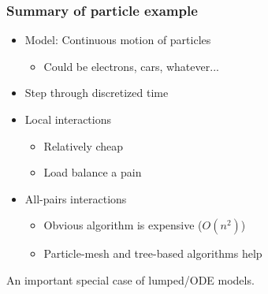 \documentclass{beamer}
\begin{document}
\begin{frame}
  \frametitle{Summary of particle example}

  \begin{itemize}
  \item Model: Continuous motion of particles
    \begin{itemize}
    \item Could be electrons, cars, whatever...
    \end{itemize}
  \item Step through discretized time
  \item Local interactions
    \begin{itemize}
    \item Relatively cheap
    \item Load balance a pain
    \end{itemize}
  \item All-pairs interactions
    \begin{itemize}
    \item Obvious algorithm is expensive ($O(n^2)$)
    \item Particle-mesh and tree-based algorithms help
    \end{itemize}
  \end{itemize}

  An important special case of lumped/ODE models.
\end{frame}

\end{document}
